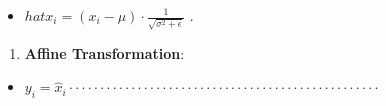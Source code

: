 \documentclass[
  10
]{article}
\providecommand{\tightlist}{%
  \setlength{\itemsep}{0pt}\setlength{\parskip}{0pt}}
\begin{document}
\begin{itemize}
\tightlist
\item
  \(hat{x}_i = (x_i - \mu) \cdot \frac{1}{\sqrt{\sigma^2 + \epsilon}}\)
  .
\end{itemize}

\begin{enumerate}
\def\labelenumi{\arabic{enumi}.}
\setcounter{enumi}{3}
\tightlist
\item
  \textbf{Affine Transformation}:\\
\end{enumerate}

\begin{itemize}
\tightlist
\item
  \(y_i = \hat{x}_i \cdot \cdot \cdot \cdot \cdot \cdot \cdot \cdot \cdot \cdot \cdot \cdot \cdot \cdot \cdot \cdot \cdot \cdot \cdot \cdot \cdot \cdot \cdot \cdot \cdot \cdot \cdot \cdot \cdot \cdot \cdot \cdot \cdot \cdot \cdot \cdot \cdot \cdot \cdot \cdot \cdot \cdot \cdot \cdot \cdot \cdot \cdot \cdot \cdot \cdot\)
\end{itemize}
\end{document}
